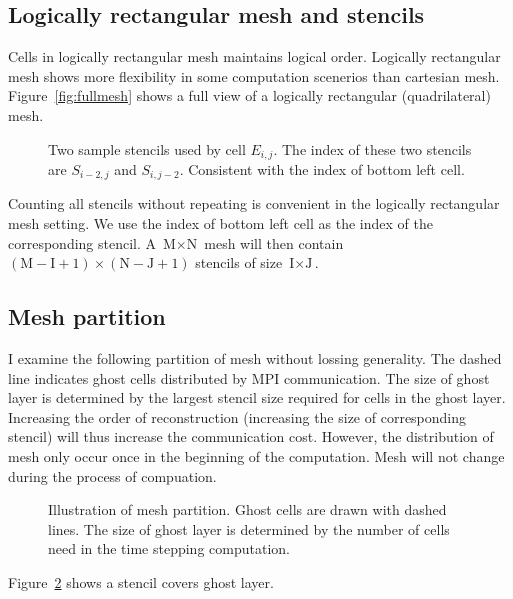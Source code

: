 \subsection{Logically rectangular mesh and stencils}
Cells in logically rectangular mesh maintains logical 
order. Logically rectangular mesh shows more flexibility 
in some computation scenerios than cartesian mesh.
Figure~\ref{fig:fullmesh} 
shows a full view of a logically rectangular (quadrilateral) mesh.
\begin{figure}[htb]
		  \parbox{\textwidth}{\begin{minipage}[t]{0.45\textwidth}
		  
		  \caption{Logically rectangular 
		  mesh displayed in full. The index of 
		  a stencil (colored cells) is the 
		  same as the index of the red cell.}
\label{fig:fullmesh}
		  \end{minipage}
		  \hfill
		  \begin{minipage}[t]{.45\textwidth}

					 \caption{Two sample stencils used by cell $E_{i,j}$.
					 The index of these two stencils are $S_{i-2,j}$ and $S_{i,j-2}$.
					 Consistent with the index of bottom left cell.}
		  \label{fig:stencil}
		  \end{minipage}}
\end{figure}
Counting all stencils without repeating is convenient 
in the logically rectangular mesh setting. 
We use the index of bottom left cell as the index of 
the corresponding stencil. A $\text{M}\times \text{N}$ mesh will then contain
$(\text{M}-\text{I}+1)\times(\text{N}-\text{J}+1)$ stencils 
of size $\text{I}\times \text{J}$.

\subsection{Mesh partition}
I examine the following partition of mesh without lossing generality.
The dashed line indicates ghost cells distributed by
MPI communication. 
The size of ghost layer is determined by the largest stencil
size required for cells in the ghost layer.
Increasing the order of reconstruction (increasing the size
of corresponding stencil) will thus increase the communication 
cost. However, the distribution of mesh only occur once 
in the beginning of the computation. Mesh will not change during
the process of compuation.
\begin{figure}\label{fig:partitionmesh}

		  \caption{Illustration of mesh partition.
		  Ghost cells are drawn with dashed lines.
		  The size of ghost layer is determined 
		  by the number of cells need in the 
		  time stepping computation.}
\end{figure}
Figure~\ref{fig:partitionmesh} shows a stencil
covers ghost layer.

